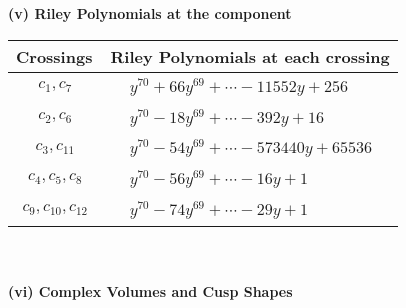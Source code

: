 \documentclass[1p]{elsarticle_modified}
\theoremstyle{definition}
\begin{document}
\newpage\renewcommand{\arraystretch}{1}
\flushleft \textbf{(v) Riley Polynomials at the component}\newline \\
\begin{tabular}{m{50pt}|m{274pt}}
Crossings & \hspace{64pt}Riley Polynomials at each crossing \\
\hline $$\begin{aligned}c_{1},c_{7}\end{aligned}$$&$\begin{aligned}
&y^{70}+66 y^{69}+\cdots-11552 y+256
\end{aligned}$\\
\hline $$\begin{aligned}c_{2},c_{6}\end{aligned}$$&$\begin{aligned}
&y^{70}-18 y^{69}+\cdots-392 y+16
\end{aligned}$\\
\hline $$\begin{aligned}c_{3},c_{11}\end{aligned}$$&$\begin{aligned}
&y^{70}-54 y^{69}+\cdots-573440 y+65536
\end{aligned}$\\
\hline $$\begin{aligned}c_{4},c_{5},c_{8}\end{aligned}$$&$\begin{aligned}
&y^{70}-56 y^{69}+\cdots-16 y+1
\end{aligned}$\\
\hline $$\begin{aligned}c_{9},c_{10},c_{12}\end{aligned}$$&$\begin{aligned}
&y^{70}-74 y^{69}+\cdots-29 y+1
\end{aligned}$\\
\hline
\end{tabular}\\~\\
\newpage\flushleft \textbf{(vi) Complex Volumes and Cusp Shapes}
\end{document}
